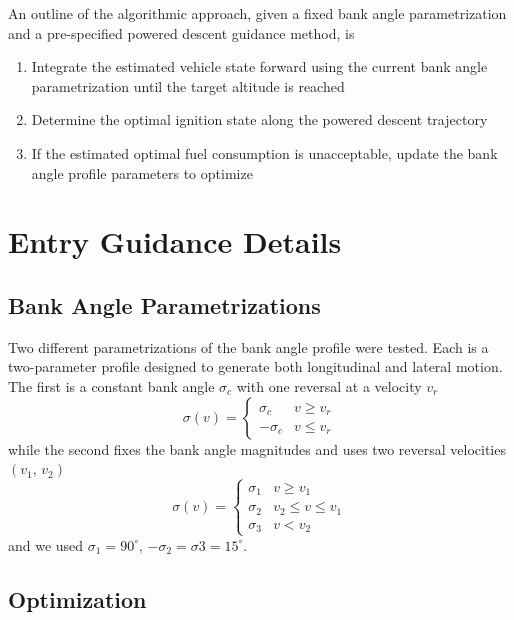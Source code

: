 \documentclass[]{article}
\begin{document}
An outline of the algorithmic approach, given a fixed bank angle parametrization and a pre-specified powered descent guidance method, is 
\begin{enumerate}
\item Integrate the estimated vehicle state forward using the current bank angle parametrization until the target altitude is reached
\item Determine the optimal ignition state along the powered descent trajectory
\item If the estimated optimal fuel consumption is unacceptable, update the bank angle profile parameters to optimize 
\end{enumerate}


\section{Entry Guidance Details}


\subsection{Bank Angle Parametrizations}
Two different parametrizations of the bank angle profile were tested. Each is a two-parameter profile designed to generate both longitudinal and lateral motion. The first is a constant bank angle $\sigma_c$ with one reversal at a velocity $v_r$
\begin{equation}
\sigma(v) = \left\{
\begin{array}{ll}
\sigma_c & v\geq v_r \\
-\sigma_c & v\le v_r
\end{array} 
\right.
\end{equation}
while the second fixes the bank angle magnitudes and uses two reversal velocities $(v_1,\,v_2)$
\begin{equation}
\sigma(v) = \left\{
\begin{array}{ll}
\sigma_1 & v\geq v_1 \\
\sigma_2 & v_2\leq v\le v_1 \\
\sigma_3 & v< v_2
\end{array} 
\right.
\end{equation}
and we used $\sigma_1 = 90^\circ$, $-\sigma_2 = \sigma3 = 15^\circ$.
\subsection{Optimization}
\end{document}
